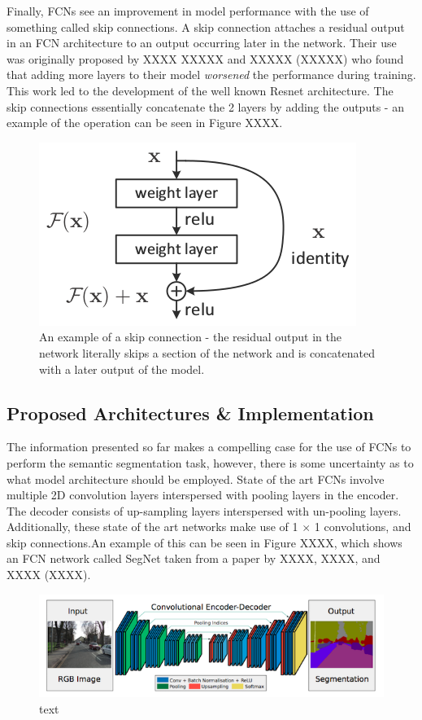 \documentclass[a4paper]{article}
\begin{document}
Finally, FCNs see an improvement in model performance with the use of something called skip connections. A skip connection attaches a residual output in an FCN architecture to an output occurring later in the network. Their use was originally proposed by XXXX XXXXX and XXXXX (XXXXX) who found that adding more layers to their model \textit{worsened} the performance during training. This work led to the development of the well known Resnet architecture. The skip connections essentially concatenate the 2 layers by adding the outputs - an example of the operation can be seen in Figure XXXX.
\begin{figure}[h]
\centering
\includegraphics[scale=0.5]{skip}
\caption{An example of a skip connection - the residual output in the network literally skips a section of the network and is concatenated with a later output of the model.}
\end{figure}

\subsection{Proposed Architectures \& Implementation}
The information presented so far makes a compelling case for the use of FCNs to perform the semantic segmentation task, however, there is some uncertainty as to what model architecture should be employed. State of the art FCNs involve multiple 2D convolution layers interspersed with pooling layers in the encoder. The decoder consists of up-sampling layers interspersed with un-pooling layers. Additionally, these state of the art networks make use of 1 $\times$ 1 convolutions, and skip connections.An example of this can be seen in Figure XXXX, which shows an FCN network called SegNet taken from a paper by XXXX, XXXX, and XXXX (XXXX).
\begin{figure}[h]
\centering
\includegraphics[scale=0.6]{segnet}
\caption{text}
\end{figure}
\end{document}
